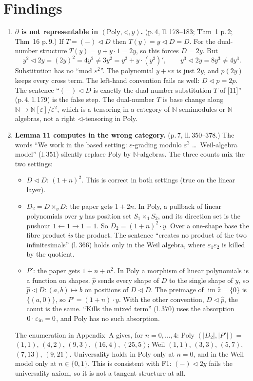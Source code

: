 \documentclass[11pt]{article}
\newcommand{\tri}{\mathbin{\triangleleft}}
\newcommand{\N}{\mathbb{N}}
\begin{document}
\section*{Findings}
\begin{enumerate}[label=\textbf{F\arabic*.},leftmargin=*]

\item \textbf{$\partial$ is not representable in $(\mathrm{Poly},\tri,y)$.} (p.\,4, ll.\,178--183;
Thm~1 p.\,2; Thm~16 p.\,9.) If $T=(-)\tri D$ then $T(y)=y\tri D=D$. For the dual-number
structure $T(y)=y+y\cdot 1=2y$, so this forces $D=2y$. But
\[
y^2\tri 2y=(2y)^2=4y^2\neq 3y^2=y^2+y\cdot(y^2)' ,\qquad y^3\tri 2y=8y^3\neq 4y^3 .
\]
Substitution has no ``mod $\varepsilon^2$''. The polynomial $y+\varepsilon v$ is just $2y$, and
$p(2y)$ keeps every cross term. The left-hand convention fails as well: $D\tri p=2p$. The
sentence ``$(-)\tri D$ is exactly the dual-number substitution $T$ of [11]'' (p.\,4, l.\,179) is
the false step. The dual-number $T$ is base change along $\N\to\N[\varepsilon]/\varepsilon^2$,
which is a tensoring in a category of $\N$-semimodules or $\N$-algebras, not a right
$\tri$-tensoring in Poly.

\item \textbf{Lemma 11 computes in the wrong category.} (p.\,7, ll.\,350--378.) The words ``We
work in the based setting: $\varepsilon$-grading modulo $\varepsilon^2$ \dots\ Weil-algebra
model'' (l.\,351) silently replace Poly by $\N$-algebras. The three counts mix the two settings:
\begin{itemize}[leftmargin=1.2em]
\item $D\tri D$: $(1+n)^2$. This is correct in both settings (true on the linear layer).
\item $D_2=D\times_y D$: the paper gets $1+2n$. In Poly, a pullback of linear polynomials over $y$
has position set $S_1\times_{1}S_2$, and its direction set is the pushout $1\leftarrow1\to1=1$.
So $D_2=(1+n)^2\cdot y$. Over a one-shape base the fibre product \emph{is} the product. The
sentence ``creates no product of the two infinitesimals'' (l.\,366) holds only in the Weil
algebra, where $\varepsilon_1\varepsilon_2$ is killed by the quotient.
\item $P'$: the paper gets $1+n+n^2$. In Poly a morphism of linear polynomials is a function on
shapes. $\hat p$ sends every shape of $D$ to the single shape of $y$, so
$\hat p\tri D:(a,b)\mapsto b$ on positions of $D\tri D$. The preimage of $\operatorname{im}\hat
z=\{0\}$ is $\{(a,0)\}$, so $P'=(1+n)\cdot y$. With the other convention, $D\tri\hat p$, the
count is the same. ``Kills the mixed term'' (l.\,370) uses the absorption
$0\cdot\varepsilon_{\rm in}=0$, and Poly has no such absorption.
\end{itemize}
The enumeration in Appendix~A gives, for $n=0,\dots,4$: Poly
$(|D_2|,|P'|)=$ $(1,1)$, $(4,2)$, $(9,3)$, $(16,4)$, $(25,5)$;
Weil $(1,1)$, $(3,3)$, $(5,7)$, $(7,13)$, $(9,21)$.
Universality holds in Poly only at $n=0$, and in the Weil model only at $n\in\{0,1\}$. This is
consistent with F1: $(-)\tri 2y$ fails the universality axiom, so it is not a tangent structure
at all.


\end{enumerate}
\end{document}
